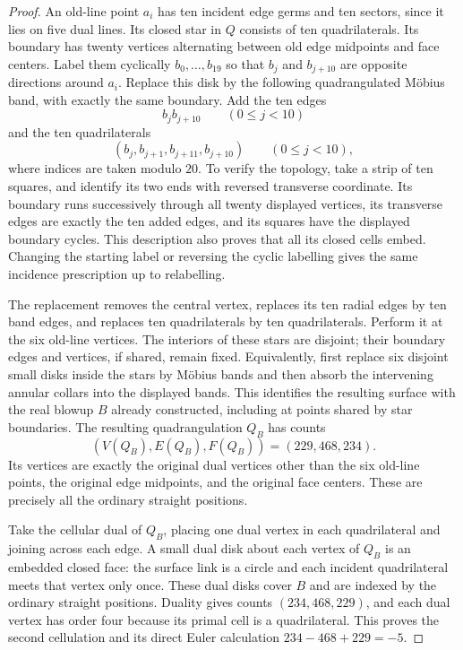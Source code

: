 \begin{proof}
An old-line point $a_i$ has ten incident edge germs and ten sectors,
since it lies on five dual lines. Its closed star in $Q$ consists
of ten quadrilaterals. Its boundary has twenty vertices alternating
between old edge midpoints and face centers. Label them cyclically
$b_0,\ldots,b_{19}$ so that $b_j$ and $b_{j+10}$ are opposite
directions around $a_i$. Replace this disk by the following
quadrangulated M\"obius band, with exactly the same boundary. Add
the ten edges
\[
             b_jb_{j+10}\qquad(0\le j<10)
\]
and the ten quadrilaterals
\[
 (b_j,b_{j+1},b_{j+11},b_{j+10})\qquad(0\le j<10),
\]
where indices are taken modulo $20$. To verify the topology, take
a strip of ten squares, and identify its two ends with reversed
transverse coordinate. Its boundary runs successively through all
twenty displayed vertices, its transverse edges are exactly the ten
added edges, and its squares have the displayed boundary cycles.
This description also proves that all its closed cells embed.
Changing the starting label or reversing the cyclic labelling gives
the same incidence prescription up to relabelling.

The replacement removes the central vertex, replaces its ten radial
edges by ten band edges, and replaces ten quadrilaterals by ten
quadrilaterals. Perform it at the six old-line vertices. The interiors
of these stars are disjoint; their boundary edges and vertices, if
shared, remain fixed. Equivalently, first replace six disjoint small
disks inside the stars by M\"obius bands and then absorb the intervening
annular collars into the displayed bands. This identifies the resulting
surface with the real blowup $B$ already constructed, including at
points shared by star boundaries. The resulting quadrangulation $Q_B$
has counts
\[
                  (V(Q_B),E(Q_B),F(Q_B))=(229,468,234).
\]
Its vertices are exactly the original dual vertices other than the
six old-line points, the original edge midpoints, and the original
face centers. These are precisely all the ordinary straight positions.

Take the cellular dual of $Q_B$, placing one dual vertex in each
quadrilateral and joining across each edge. A small dual disk about
each vertex of $Q_B$ is an embedded closed face: the surface link is
a circle and each incident quadrilateral meets that vertex only once.
These dual disks cover $B$ and are indexed by the ordinary straight
positions. Duality gives counts $(234,468,229)$, and each dual vertex
has order four because its primal cell is a quadrilateral. This proves
the second cellulation and its direct Euler calculation
$234-468+229=-5$.


\end{proof}
